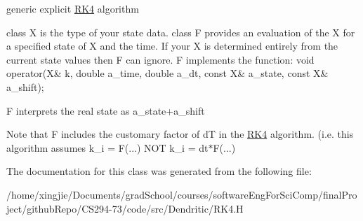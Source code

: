 generic explicit \hyperlink{classRK4}{R\+K4} algorithm 

class X is the type of your state data. class F provides an evaluation of the X\textquotesingle{} for a specified state of X and the time. If your X\textquotesingle{} is determined entirely from the current state values then F can ignore. F implements the function\+: void operator(\+X\& k, double a\+\_\+time, double a\+\_\+dt, const X\& a\+\_\+state, const X\& a\+\_\+shift);

F interprets the real state as a\+\_\+state+a\+\_\+shift

Note that F includes the customary factor of d\+T in the \hyperlink{classRK4}{R\+K4} algorithm. (i.\+e. this algorithm assumes k\+\_\+i = F(...) N\+O\+T k\+\_\+i = dt$\ast$\+F(...) 

The documentation for this class was generated from the following file\+:\begin{DoxyCompactItemize}
\item 
/home/xingjie/\+Documents/grad\+School/courses/software\+Eng\+For\+Sci\+Comp/final\+Project/github\+Repo/\+C\+S294-\/73/code/src/\+Dendritic/R\+K4.\+H\end{DoxyCompactItemize}
